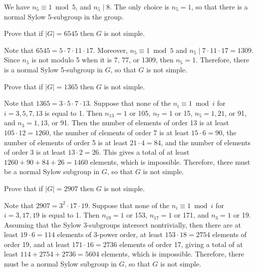 \begin{sol}
	We have $n_5 \equiv 1 \bmod 5$, and $n_5 \mid 8$. The only choice is $n_5 = 1$, so that there is a normal Sylow 5-subgroup in the group.
\end{sol}

\begin{exercise}\label{ex4.5.19}
	Prove that if $|G| = 6545$ then $G$ is not simple.
\end{exercise}

\begin{sol}
	Note that $6545 = 5 \cdot 7 \cdot 11 \cdot 17$. Moreover, $n_5 \equiv 1 \bmod 5$ and $n_5 \mid 7 \cdot 11 \cdot 17 = 1309$. Since $n_5$ is not modulo 5 when it is 7, 77, or 1309, then $n_5 = 1$. Therefore, there is a normal Sylow 5-subgroup in $G$, so that $G$ is not simple.
\end{sol}

\begin{exercise}\label{ex4.5.20}
	Prove that if $|G| = 1365$ then $G$ is not simple.
\end{exercise}

\begin{sol}
	Note that $1365 = 3 \cdot 5 \cdot 7 \cdot 13$. Suppose that none of the $n_i \equiv 1 \bmod i$ for $i = 3, 5, 7, 13$ is equal to 1. Then $n_{13} = 1$ or 105, $n_7 = 1$ or 15, $n_5 = 1, 21$, or 91, and $n_3 = 1, 13$, or 91. Then the number of elements of order 13 is at least $105 \cdot 12 = 1260$, the number of elements of order 7 is at least $15 \cdot 6 = 90$, the number of elements of order 5 is at least $21 \cdot 4 = 84$, and the number of elements of order 3 is at least $13 \cdot 2 = 26$. This gives a total of at least $1260 + 90 + 84 + 26 = 1460$ elements, which is impossible. Therefore, there must be a normal Sylow subgroup in $G$, so that $G$ is not simple.
\end{sol}

\begin{exercise}\label{ex4.5.21}
	Prove that if $|G| = 2907$ then $G$ is not simple.
\end{exercise}

\begin{sol}
	Note that $2907 = 3^2 \cdot 17 \cdot 19$. Suppose that none of the $n_i \equiv 1 \bmod i$ for $i = 3, 17, 19$ is equal to 1. Then $n_{19} = 1$ or 153, $n_{17} = 1$ or 171, and $n_3 = 1$ or 19. Assuming that the Sylow 3-subgroups intersect nontrivially, then there are at least $19 \cdot 6 = 114$ elements of 3-power order, at least $153 \cdot 18 = 2754$ elements of order 19, and at least $171 \cdot 16 = 2736$ elements of order 17, giving a total of at least $114 + 2754 + 2736 = 5604$ elements, which is impossible. Therefore, there must be a normal Sylow subgroup in $G$, so that $G$ is not simple.
\end{sol}

